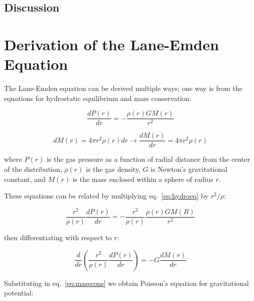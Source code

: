 \documentclass[twoside]{article}
\begin{document}
\begin{multicols}{2}

\section{Discussion}

\end{multicols}



\appendix
\appendixpage
\section{Derivation of the Lane-Emden Equation\cite[pp.176--179]{leblanc2010}} 

The Lane-Emden equation can be derived multiple ways; one way is from the
equations for hydrostatic equilibrium and mass conservation:

\begin{equation}
    \label{eq:hydroeq}
    \frac{dP(r)}{dr} = -\frac{\rho(r)GM(r)}{r^2}
    \end{equation}

    \begin{equation}
    \label{eq:masscons}
    dM(r)=4\pi r^2\rho(r)dr \rightarrow \frac{dM(r)}{dr} = 4\pi r^2\rho(r)
    \end{equation}

where \(P(r)\) is the gas pressure as a function of radial distance from the
center of the distribution, \(\rho(r)\) is the gas density, \(G\) is Newton's
gravitational constant, and \(M(r)\) is the mass enclosed within a sphere of
radius \(r\).

These equations can be related by multiplying eq.~\ref{eq:hydroeq} by
\(r^2/\rho\):

\[ \frac{r^2}{\rho(r)}\frac{dP(r)}{dr} = -\frac{r^2}{\rho(r)}
\frac{\rho(r)GM(R)}{r^2} \]

then differentiating with respect to \(r\):
            
\[
\frac{d}{dr}\left(\frac{r^2}{\rho(r)}\frac{dP(r)}{dr}\right)=-G\frac{dM(r)}{dr}
\]

Substituting in eq.~\ref{eq:masscons} we obtain Poisson's equation for gravitational potential:
\end{document}
